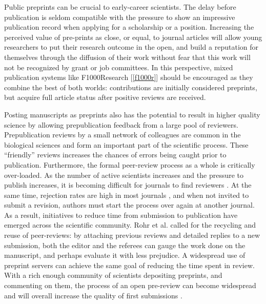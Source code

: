 \documentclass[letterpaper,twocolumn,superscriptaddress,showkeys,longbibliography]{revtex4-1}
\begin{document}
Public preprints can be crucial to early-career scientists. The delay before
publication is seldom compatible with the pressure to show an impressive
publication record when applying for a scholarship or a position. Increasing the
perceived value of pre-prints as close, or equal, to journal articles will allow
young researchers to put their research outcome in the open, and build a
reputation for themselves through the diffusion of their work without fear that
this work will not be recognized by grant or job committees. In this
perspective, mixed publication systems like F1000Research [\ref{f1000r}] should
be encouraged as they combine the best of both worlds: contributions are
initially considered preprints, but acquire full article status after positive
reviews are received.

Posting manuscripts as preprints also has the potential to result in higher
quality science by allowing prepublication feedback from a large pool of
reviewers. Prepublication reviews by a small network of colleagues are common in
the biological sciences and form an important part of the scientific process.
These ``friendly'' reviews increases the chances of errors being caught prior to
publication. Furthermore, the formal peer-review process as a whole is
critically over-loaded. As the number of active scientists increases and the
pressure to publish increases, it is becoming difficult for journals
to find reviewers \cite{hoc09}.  At the same time, rejection rates are high in
most journals \cite{aar08,roh09}, and when not invited to submit a revision,
authors must start the process over again at another journal. As a result,
initiatives to reduce time from submission to publication have emerged across
the scientific community. Rohr et al.  \cite{roh09} called for the recycling and
reuse of peer-reviews: by attaching previous reviews and detailed replies to a
new submission, both the editor and the referees can gauge the work done on the
manuscript, and perhaps evaluate it with less prejudice. A widespread use of
preprint servers can achieve the same goal of reducing the time spent in review.
With a rich enough community of scientists depositing preprints, and commenting
on them, the process of an open pre-review can become widespread and will
overall increase the quality of first submissions \cite{hoc12}.
\end{document}
